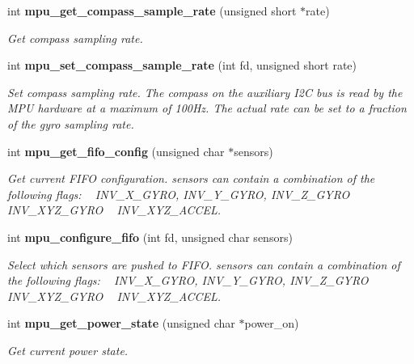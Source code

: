 \begin{DoxyCompactItemize}
int \textbf{ mpu\+\_\+get\+\_\+compass\+\_\+sample\+\_\+rate} (unsigned short $\ast$rate)
\begin{DoxyCompactList}\small\item\em Get compass sampling rate. \end{DoxyCompactList}\item 
int \textbf{ mpu\+\_\+set\+\_\+compass\+\_\+sample\+\_\+rate} (int fd, unsigned short rate)
\begin{DoxyCompactList}\small\item\em Set compass sampling rate. The compass on the auxiliary I2C bus is read by the M\+PU hardware at a maximum of 100\+Hz. The actual rate can be set to a fraction of the gyro sampling rate. \end{DoxyCompactList}\item 
int \textbf{ mpu\+\_\+get\+\_\+fifo\+\_\+config} (unsigned char $\ast$sensors)
\begin{DoxyCompactList}\small\item\em Get current F\+I\+FO configuration. {\itshape sensors} can contain a combination of the following flags\+: ~\newline
 I\+N\+V\+\_\+\+X\+\_\+\+G\+Y\+RO, I\+N\+V\+\_\+\+Y\+\_\+\+G\+Y\+RO, I\+N\+V\+\_\+\+Z\+\_\+\+G\+Y\+RO ~\newline
 I\+N\+V\+\_\+\+X\+Y\+Z\+\_\+\+G\+Y\+RO ~\newline
 I\+N\+V\+\_\+\+X\+Y\+Z\+\_\+\+A\+C\+C\+EL. \end{DoxyCompactList}\item 
int \textbf{ mpu\+\_\+configure\+\_\+fifo} (int fd, unsigned char sensors)
\begin{DoxyCompactList}\small\item\em Select which sensors are pushed to F\+I\+FO. {\itshape sensors} can contain a combination of the following flags\+: ~\newline
 I\+N\+V\+\_\+\+X\+\_\+\+G\+Y\+RO, I\+N\+V\+\_\+\+Y\+\_\+\+G\+Y\+RO, I\+N\+V\+\_\+\+Z\+\_\+\+G\+Y\+RO ~\newline
 I\+N\+V\+\_\+\+X\+Y\+Z\+\_\+\+G\+Y\+RO ~\newline
 I\+N\+V\+\_\+\+X\+Y\+Z\+\_\+\+A\+C\+C\+EL. \end{DoxyCompactList}\item 
int \textbf{ mpu\+\_\+get\+\_\+power\+\_\+state} (unsigned char $\ast$power\+\_\+on)
\begin{DoxyCompactList}\small\item\em Get current power state. \end{DoxyCompactList}\item 

\end{DoxyCompactItemize}

